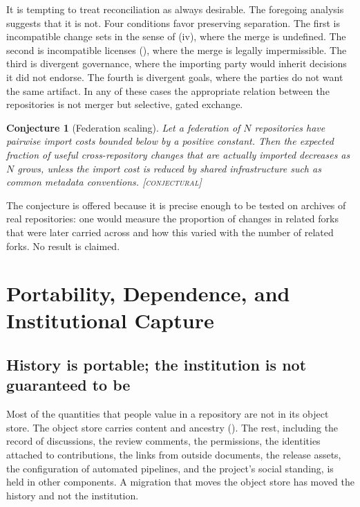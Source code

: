 \documentclass[11pt,twoside,openright]{book}
\theoremstyle{plain}
\newtheorem{conjecture}[theorem]{Conjecture}
\theoremstyle{definition}
\theoremstyle{remark}
\newcommand{\Conj}{\textup{\textsc{[conjectural]}}}
\begin{document}
It is tempting to treat reconciliation as always desirable. The foregoing analysis suggests that it is not. Four conditions favor preserving separation. The first is incompatible change sets in the sense of (iv), where the merge is undefined. The second is incompatible licenses (), where the merge is legally impermissible. The third is divergent governance, where the importing party would inherit decisions it did not endorse. The fourth is divergent goals, where the parties do not want the same artifact. In any of these cases the appropriate relation between the repositories is not merger but selective, gated exchange.

\begin{conjecture}[Federation scaling]\label{conj:fedscale}
Let a federation of $N$ repositories have pairwise import costs bounded below by a positive constant. Then the expected fraction of useful cross-repository changes that are actually imported decreases as $N$ grows, unless the import cost is reduced by shared infrastructure such as common metadata conventions.
\Conj{}
\end{conjecture}

The conjecture is offered because it is precise enough to be tested on archives of real repositories: one would measure the proportion of changes in related forks that were later carried across and how this varied with the number of related forks. No result is claimed.

\chapter{Portability, Dependence, and Institutional Capture}\label{ch:portability}

\section{History is portable; the institution is not guaranteed to be}

Most of the quantities that people value in a repository are not in its object store. The object store carries content and ancestry (). The rest, including the record of discussions, the review comments, the permissions, the identities attached to contributions, the links from outside documents, the release assets, the configuration of automated pipelines, and the project's social standing, is held in other components. A migration that moves the object store has moved the history and not the institution.
\end{document}
